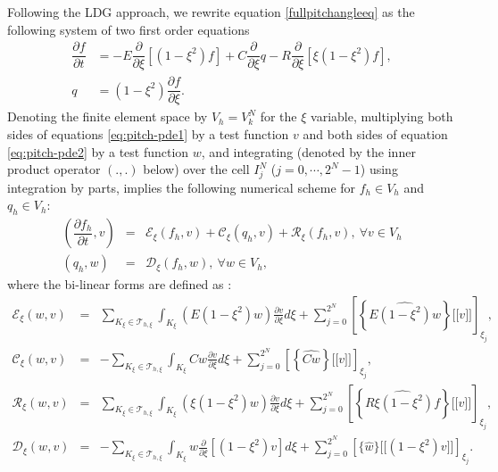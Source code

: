 \documentclass[preprint,11pt]{elsarticle}
\def\ljump{{[\![}}
\def\rjump{{]\!]}}
\begin{document}
Following the LDG approach, we rewrite equation \ref{fullpitchangleeq} as the following system of two first order equations
%
\begin{align}
	\dfrac{\partial f}{\partial t} &= -E\dfrac{\partial}{\partial\xi}[(1-\xi^2)f]+C\dfrac{\partial}{\partial\xi}q-R\dfrac{\partial}{\partial\xi}[\xi(1-\xi^2)f],\label{eq:pitch-pde1}\\
	q &= (1-\xi^2)\dfrac{\partial f}{\partial\xi}. \label{eq:pitch-pde2}
\end{align}
%
Denoting the finite element space by $V_h = V_k^N$ for the $\xi$ variable, multiplying both sides of equations \ref{eq:pitch-pde1} by a test function $v$ and both sides of equation \ref{eq:pitch-pde2} by a test function $w$, and integrating (denoted by the inner product operator $\left(.,.\right)$ below) over the cell $I_j^N$ ($j = 0,\cdots,2^N-1$) using integration by parts, implies the following numerical scheme for $f_h\in V_h$ and $q_h\in V_h$:
%
\begin{eqnarray}
\label{numericalschemepitchangle1}
(\dfrac{\partial f_h}{\partial t},v) &=& \mathcal{E}_{\xi}(f_h,v)+\mathcal{C}_{\xi}(q_h,v)+\mathcal{R}_{\xi}(f_h,v),\ \forall v\in V_h\\
\label{numericalschemepitchangle2}
(q_h,w)&=& \mathcal{D}_{\xi}(f_h,w),\ \forall w\in V_h,
\end{eqnarray}
%
where the bi-linear forms are defined as :
%
\begin{eqnarray}
\mathcal{E}_{\xi}(w,v) &=& \sum_{K_{\xi}\in \mathcal{T}_{h,\xi}}\int_{K_\xi}(E(1-\xi^2)w)\frac{\partial v}{\partial\xi} d\xi+\sum_{j=0}^{2^N} \left[\left\{\widehat{ E(1-\xi^2){w}}\right\}\ljump v\rjump\right]_{\xi_j}, 
\\
\mathcal{C}_{\xi}(w,v) &=& -\sum_{K_{\xi}\in \mathcal{T}_{h,\xi}}\int_{K_{\xi}}Cw\frac{\partial v}{\partial\xi}d\xi+
\sum_{j=0}^{2^N} \left[\left\{ \widehat{Cw}\right\}\ljump v\rjump\right]_{\xi_j},
\\
\mathcal{R}_{\xi}(w,v) &=&
\sum_{K_{\xi}\in \mathcal{T}_{h,\xi}}\int_{K_{\xi}}(\xi(1-\xi^2)w)\frac{\partial v}{\partial\xi}d\xi+
\sum_{j=0}^{2^N} \left[\left\{ \widehat{R\xi(1-\xi^2){f}}\right\}\ljump v\rjump\right]_{\xi_j},
\\
\mathcal{D}_{\xi}(w,v)&=&
-\sum_{K_{\xi}\in \mathcal{T}_{h,\xi}}\int_{K_{\xi}}w\frac{\partial}{\partial\xi}\left[(1-\xi^2)v\right]d\xi+
\sum_{j=0}^{2^N} \left[\{ \widehat{w}\}\ljump(1-\xi^2)v\rjump
\right]_{\xi_j}.
\end{eqnarray}
%
\end{document}
